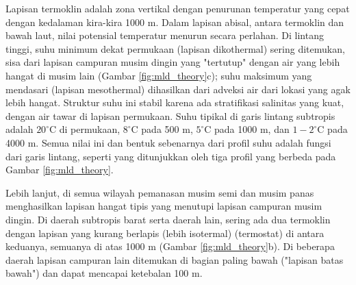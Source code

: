 \begin{spacing}{1.5}
	Lapisan termoklin adalah zona vertikal dengan penurunan temperatur yang cepat dengan kedalaman kira-kira 1000 m. Dalam lapisan abisal, antara termoklin dan bawah laut, nilai potensial temperatur menurun secara perlahan. Di lintang tinggi, suhu minimum dekat permukaan (lapisan dikothermal) sering ditemukan, sisa dari lapisan campuran musim dingin yang "tertutup" dengan air yang lebih hangat di musim lain (Gambar \ref{fig:mld_theory}c); suhu maksimum yang mendasari (lapisan mesothermal) dihasilkan dari adveksi air dari lokasi yang agak lebih hangat. Struktur suhu ini stabil karena ada stratifikasi salinitas yang kuat, dengan air tawar di lapisan permukaan. Suhu tipikal di garis lintang subtropis adalah $20^\circ$C di permukaan, $8^\circ$C pada 500 m, $5^\circ$C pada 1000 m, dan $1-2^\circ$C pada 4000 m. Semua nilai ini dan bentuk sebenarnya dari profil suhu adalah fungsi dari garis lintang, seperti yang ditunjukkan oleh tiga profil yang berbeda pada Gambar \ref{fig:mld_theory}.
	
	Lebih lanjut, di semua wilayah pemanasan musim semi dan musim panas menghasilkan lapisan hangat tipis yang menutupi lapisan campuran musim dingin. Di daerah subtropis barat serta daerah lain, sering ada dua termoklin dengan lapisan yang kurang berlapis (lebih isotermal) (termostat) di antara keduanya, semuanya di atas 1000 m (Gambar \ref{fig:mld_theory}b). Di beberapa daerah lapisan campuran lain ditemukan di bagian paling bawah ("lapisan batas bawah") dan dapat mencapai ketebalan 100 m.
\end{spacing}
\vspace{-0.1pc}
%
